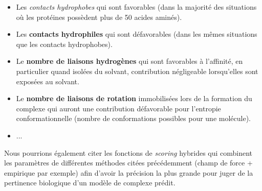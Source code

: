 \begin{itemize}
	\item Les \textit{contacts hydrophobes} qui sont favorables (dans la majorité des situations où les protéines possèdent plus de 50 acides aminés).
	\item Les \textbf{contacts hydrophiles} qui sont défavorables (dans les mêmes situations que les contacts hydrophobes).
	\item Le \textbf{nombre de liaisons hydrogènes} qui sont favorables à l'affinité, en particulier quand isolées du solvant, contribution négligeable lorsqu'elles sont exposées au solvant.
	\item Le \textbf{nombre de liaisons de rotation} immobilisées lors de la formation du complexe qui auront une contribution défavorable pour l'entropie conformationnelle (nombre de conformations possibles pour une molécule).
	\item ...
\end{itemize}

Nous pourrions également citer les fonctions de \textit{scoring} hybrides qui combinent les paramètres de différentes méthodes citées précédemment (champ de force + empirique par exemple) afin d'avoir la précision la plus grande pour juger de la pertinence biologique d'un modèle de complexe prédit.

